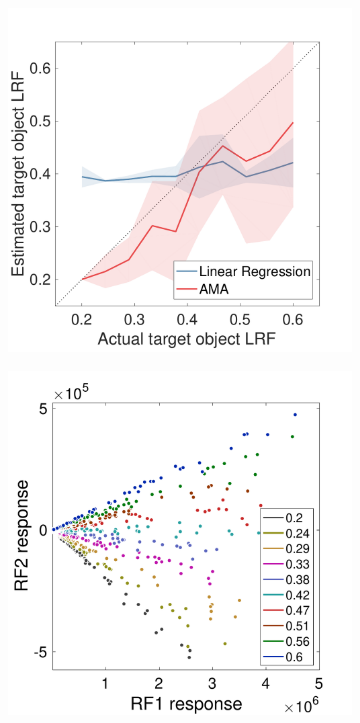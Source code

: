 \documentclass{jov}
\providecommand{\DIFaddbeginFL}{} %
\providecommand{\DIFaddendFL}{} %
\providecommand{\DIFdelbeginFL}{} %
\providecommand{\DIFdelendFL}{} %
\newcommand{\DIFscaledelfig}{0.5}
\newlength{\DIFdelgraphicswidth} %
\newlength{\DIFdelgraphicsheight} %
\newcommand{\DIFaddincludegraphics}[2][]{{\color{blue}\fbox{\DIFOincludegraphics[#1]{#2}}}} %
\newcommand{\DIFdelincludegraphics}[2][]{%
\sbox{\DIFdelgraphicsbox}{\DIFOincludegraphics[#1]{#2}}%
\settoboxwidth{\DIFdelgraphicswidth}{\DIFdelgraphicsbox} %
\settoboxtotalheight{\DIFdelgraphicsheight}{\DIFdelgraphicsbox} %
\scalebox{\DIFscaledelfig}{%
\parbox[b]{\DIFdelgraphicswidth}{\usebox{\DIFdelgraphicsbox}\\[-\baselineskip] \rule{\DIFdelgraphicswidth}{0em}}\llap{\resizebox{\DIFdelgraphicswidth}{\DIFdelgraphicsheight}{%
\setlength{\unitlength}{\DIFdelgraphicswidth}%
\begin{picture}(1,1)%
\thicklines\linethickness{2pt} %
{\color[rgb]{1,0,0}\put(0,0){\framebox(1,1){}}}%
{\color[rgb]{1,0,0}\put(0,0){\line( 1,1){1}}}%
{\color[rgb]{1,0,0}\put(0,1){\line(1,-1){1}}}%
\end{picture}%
}\hspace*{3pt}}} %
} %
\DeclareRobustCommand{\DIFaddbeginFL}{\DIFOaddbeginFL \let\includegraphics\DIFaddincludegraphics} %
\DeclareRobustCommand{\DIFaddendFL}{\DIFOaddendFL \let\includegraphics\DIFOincludegraphics} %
\DeclareRobustCommand{\DIFdelbeginFL}{\DIFOdelbeginFL \let\includegraphics\DIFdelincludegraphics} %
\DeclareRobustCommand{\DIFdelendFL}{\DIFOaddendFL \let\includegraphics\DIFOincludegraphics} %
\begin{document}
\begin{figure}
\centering
    \begin{subfigure}[b]{0.22\textwidth}   
        \caption{\DIFdelbeginFL %
\DIFdelendFL \DIFaddbeginFL {} \DIFaddendFL \newline{}}
        \includegraphics[width=\textwidth, trim={0 0 0 1.5cm},clip]{../FiguresDraft5/Figure11/Figure11_a.pdf}
        \label{fig:case2IsomerizationEstimates}
    \end{subfigure}
        \begin{subfigure}[b]{0.22 \textwidth}
        \caption{ \newline{}}
        \includegraphics[width=\textwidth, trim={0 0 0 1.5cm},clip]{../FiguresDraft5/Figure11/Figure11_b.pdf}

\end{subfigure}
\end{figure}
\end{document}
